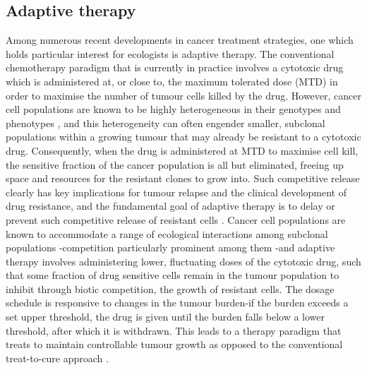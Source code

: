 \documentclass[12pt,onecolumn,twoside]{article}
\begin{document}
	\subsection{Adaptive therapy}
	Among numerous recent developments in cancer treatment strategies, one which holds particular interest for ecologists is adaptive therapy. The conventional chemotherapy paradigm that is currently in practice involves a cytotoxic drug which is administered at, or close to, the maximum tolerated dose (MTD) in order to maximise the number of tumour cells killed by the drug. However, cancer cell populations are known to be highly heterogeneous in their genotypes and phenotypes \citep{DENTRO20212239, Shen2020a, Geiler-Samerotte2013, Hu2016}, and this heterogeneity can often engender smaller, subclonal populations within a growing tumour that may already be resistant to a cytotoxic drug. Consequently, when the drug is administered at MTD to maximise cell kill, the sensitive fraction of the cancer population is all but eliminated, freeing up space and resources for the resistant clones to grow into. Such competitive release clearly has key implications for tumour relapse and the clinical development of drug resistance, and the fundamental goal of adaptive therapy is to delay or prevent such competitive release of resistant cells \citep{Gatenby2009}. Cancer cell populations are known to accommodate a range of ecological interactions among subclonal populations \citep{KotlerBrown2020}-competition particularly prominent among them \citep{Parker2020}-and adaptive therapy involves administering lower, fluctuating doses of the cytotoxic drug, such that some fraction of drug sensitive cells remain in the tumour population to inhibit through biotic competition, the growth of resistant cells. The dosage schedule is responsive to changes in the tumour burden-if the burden exceeds a set upper threshold, the drug is given until the burden falls below a lower threshold, after which it is withdrawn. This leads to a therapy paradigm that treats to maintain controllable tumour growth as opposed to the conventional treat-to-cure approach \citep{Hansen2017a, Hansen2020a}.
\end{document}
